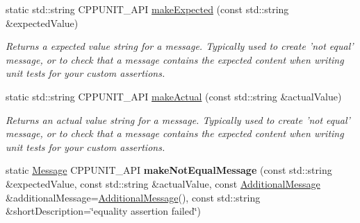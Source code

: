 \begin{DoxyCompactItemize}
static std\-::string C\-P\-P\-U\-N\-I\-T\-\_\-\-A\-P\-I \hyperlink{struct_asserter_adcbee7c01d58bfaee72cc984627e6432}{make\-Expected} (const std\-::string \&expected\-Value)
\begin{DoxyCompactList}\small\item\em Returns a expected value string for a message. Typically used to create 'not equal' message, or to check that a message contains the expected content when writing unit tests for your custom assertions. \end{DoxyCompactList}\item 
static std\-::string C\-P\-P\-U\-N\-I\-T\-\_\-\-A\-P\-I \hyperlink{struct_asserter_ae52920ca7ffd981df61d7a3cfd88793b}{make\-Actual} (const std\-::string \&actual\-Value)
\begin{DoxyCompactList}\small\item\em Returns an actual value string for a message. Typically used to create 'not equal' message, or to check that a message contains the expected content when writing unit tests for your custom assertions. \end{DoxyCompactList}\item 
\hypertarget{struct_asserter_adb8ac36c8f0d385430e5a087a66219db}{static \hyperlink{class_message}{Message} C\-P\-P\-U\-N\-I\-T\-\_\-\-A\-P\-I {\bfseries make\-Not\-Equal\-Message} (const std\-::string \&expected\-Value, const std\-::string \&actual\-Value, const \hyperlink{class_additional_message}{Additional\-Message} \&additional\-Message=\hyperlink{class_additional_message}{Additional\-Message}(), const std\-::string \&short\-Description=\char`\"{}equality assertion failed\char`\"{})}\label{struct_asserter_adb8ac36c8f0d385430e5a087a66219db}


\end{DoxyCompactItemize}
